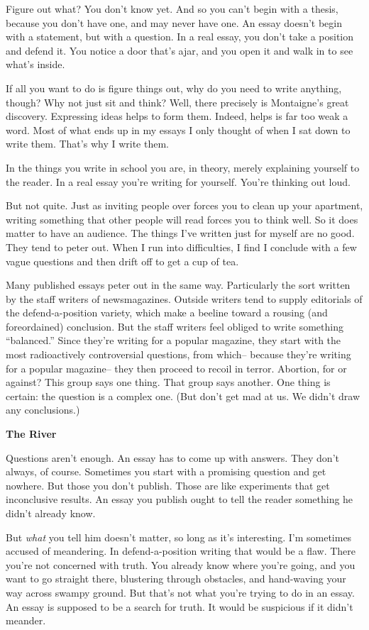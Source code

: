 \documentclass[12pt]{book}
\begin{document}
Figure out what? You don't know yet. And so you can't begin with a
thesis, because you don't have one, and may never have one. An essay
doesn't begin with a statement, but with a question. In a real essay,
you don't take a position and defend it. You notice a door that's ajar,
and you open it and walk in to see what's inside.

If all you want to do is figure things out, why do you need to write
anything, though? Why not just sit and think? Well, there precisely is
Montaigne's great discovery. Expressing ideas helps to form them.
Indeed, helps is far too weak a word. Most of what ends up in my essays
I only thought of when I sat down to write them. That's why I write
them.

In the things you write in school you are, in theory, merely explaining
yourself to the reader. In a real essay you're writing for yourself.
You're thinking out loud.

But not quite. Just as inviting people over forces you to clean up your
apartment, writing something that other people will read forces you to
think well. So it does matter to have an audience. The things I've
written just for myself are no good. They tend to peter out. When I run
into difficulties, I find I conclude with a few vague questions and then
drift off to get a cup of tea.

Many published essays peter out in the same way. Particularly the sort
written by the staff writers of newsmagazines. Outside writers tend to
supply editorials of the defend-a-position variety, which make a beeline
toward a rousing (and foreordained) conclusion. But the staff writers
feel obliged to write something ``balanced.'' Since they're writing for
a popular magazine, they start with the most radioactively controversial
questions, from which-- because they're writing for a popular magazine--
they then proceed to recoil in terror. Abortion, for or against? This
group says one thing. That group says another. One thing is certain: the
question is a complex one. (But don't get mad at us. We didn't draw any
conclusions.)

\textbf{The River}

Questions aren't enough. An essay has to come up with answers. They
don't always, of course. Sometimes you start with a promising question
and get nowhere. But those you don't publish. Those are like experiments
that get inconclusive results. An essay you publish ought to tell the
reader something he didn't already know.

But \emph{what} you tell him doesn't matter, so long as it's
interesting. I'm sometimes accused of meandering. In defend-a-position
writing that would be a flaw. There you're not concerned with truth. You
already know where you're going, and you want to go straight there,
blustering through obstacles, and hand-waving your way across swampy
ground. But that's not what you're trying to do in an essay. An essay is
supposed to be a search for truth. It would be suspicious if it didn't
meander.
\end{document}
